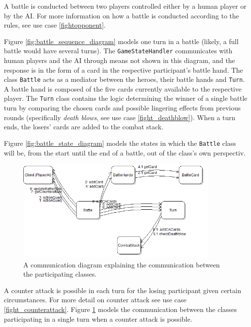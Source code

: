 A battle is conducted between two players controlled either by a human player or by the AI. For more information on how a battle is conducted according to the rules, see use case \ref{fightopponent}.

Figure \ref{fig:battle_sequence_diagram} models one turn in a battle (likely, a full battle would have several turns). The \texttt{GameStateHandler} communicates with human players and the AI through means not shown in this diagram, and the response is in the form of a card in the respective participant's battle hand. The class \texttt{Battle} acts as a mediator between the heroes, their battle hands and \texttt{Turn}. A battle hand is composed of the five cards currently available to the respective player. The \texttt{Turn} class contains the logic determining the winner of a single battle turn by comparing the chosen cards and possible lingering effects from previous rounds (specifically \emph{death blows}, see use case \ref{fight_deathblow}). When a turn ends, the losers' cards are added to the combat stack.

Figure \ref{fig:battle_state_diagram} models the states in which the \texttt{Battle} class will be, from the start until the end of a battle, out of the class's own perspectiv.

\begin{figure}[h]
\center
\includegraphics[width=0.9\textwidth]{diagrams/CounterAttackCommDiagram.png}
\caption{A communication diagram explaining the communication between the participating classes.}
\label{fig:counter_attack_comm_diagram}
\end{figure}

A counter attack is possible in each turn for the losing participant given certain circumstances. For more detail on counter attack see use case \ref{fight_counterattack}. Figure \ref{fig:counter_attack_comm_diagram} models the communication between the classes participating in a single turn when a counter attack is possible.


